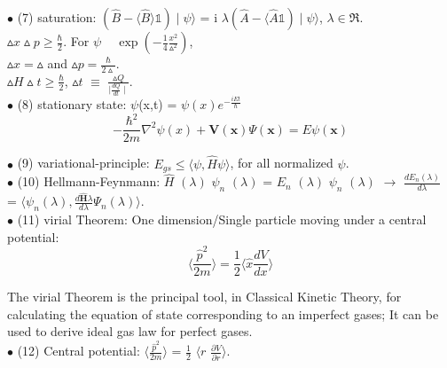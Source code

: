\documentclass[a4paper, 10pt, onepage]{elegantbook}
\begin{document}
{$\bullet$ (7) saturation: $(\hat{B} - \langle \hat{B} \rangle \mathbb1) \mid \psi \rangle$ = i $\lambda (\hat{A} - \langle \hat{A} \mathbb1)\mid \psi \rangle$, $\lambda \in \Re$.  \\
$\vartriangle{x} \vartriangle{p} \geq \frac{\hbar}{2}$. For $\psi$ ~ $\exp(- \frac{1}{4} \frac{x^2}{\vartriangle^2})$, \\
$\vartriangle{x} = \vartriangle$ and $\vartriangle{p} = \frac{\hbar}{2 \vartriangle}$. \\
$\vartriangle{H} \vartriangle{t} \geq \frac{\hbar}{2}$, $\vartriangle{t}$ $\equiv$ $\frac{\vartriangle Q } {\mid \frac{d Q}{dt} \mid}$.  \\

$\bullet$ (8) stationary state: $\psi$(x,t) = $\psi (x)e^{- \frac{iEt}{\hbar}}$  \\
\begin{equation}
- \frac{\hbar^2}{2m} \nabla^2 \psi(x) + \mathbf V(\mathbf x) \Psi(\mathbf x) = E \psi(\mathbf x)
\end{equation}

$\bullet$ (9) variational-principle: $E_{gs} \leq \langle \psi, \hat{H} \psi \rangle$, for all normalized $\psi$. \\

$\bullet$ (10) Hellmann-Feynmann: $\hat{H}$ $(\lambda)$ $\psi_n$ $(\lambda)$ = $E_n$ $(\lambda)$ $\psi_n$ $(\lambda)$ $\longrightarrow$ $\frac{dE_n (\lambda) } {d \lambda} $ = $\langle \psi_n (\lambda), \frac{d \hat{\mathbf H}{\lambda}} {d \lambda} \Psi_n(\lambda) \rangle$.  \\

$\bullet$ (11) virial Theorem: One dimension/Single particle moving under a central potential:
\begin{equation} \label{eq:virial Theorem}
\langle \frac{\hat{p}^2}{2m} \rangle = \frac{1}{2} \langle \hat{x}  \frac{dV}{dx} \rangle
\end{equation}
\noindent

The virial Theorem is the principal tool, in Classical Kinetic Theory, for calculating the equation of state corresponding to an imperfect gases; It can be used to derive ideal gas law for perfect gases.  \\

$\bullet$ (12) Central potential: $\langle \frac{\hat{p}^2}{2m} \rangle$ = $\frac{1}{2}$ $\langle{r}$ $\frac{\partial{V}}{\partial{r}} \rangle $.  \\

}
\end{document}
